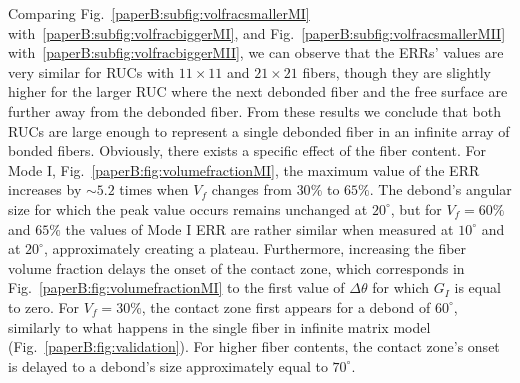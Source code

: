 Comparing Fig.~\ref{paperB:subfig:volfracsmallerMI} with~\ref{paperB:subfig:volfracbiggerMI}, and Fig.~\ref{paperB:subfig:volfracsmallerMII} with~\ref{paperB:subfig:volfracbiggerMII}, we can observe that the ERRs' values are very similar for RUCs with $11\times11$ and $21\times21$ fibers, though they are slightly higher for the larger RUC where the next debonded fiber and the free surface are further away from the debonded fiber. From these results we conclude that both RUCs are large enough to represent a single debonded fiber in an infinite array of bonded fibers. Obviously, there exists a specific effect of the fiber content. For Mode I, Fig.~\ref{paperB:fig:volumefractionMI}, the maximum value of the ERR increases by $\sim 5.2$ times when $V_{f}$ changes from $30\%$ to $65\%$. The debond's angular size for which the peak value occurs remains unchanged at $20^{\circ}$, but for $V_{f}=60\%$ and $65\%$ the values of Mode I ERR are rather similar when measured at $10^{\circ}$ and at $20^{\circ}$, approximately creating a plateau. Furthermore, increasing the fiber volume fraction delays the onset of the contact zone, which corresponds in Fig.~\ref{paperB:fig:volumefractionMI} to the first value of $\Delta\theta$ for which $G_{I}$ is equal to zero. For $V_{f}=30\%$, the contact zone first appears for a debond of $60^{\circ}$, similarly to what happens in the single fiber in infinite matrix model (Fig.~\ref{paperB:fig:validation}). For higher fiber contents, the contact zone's onset is delayed to a debond's size approximately equal to $70^{\circ}$.


